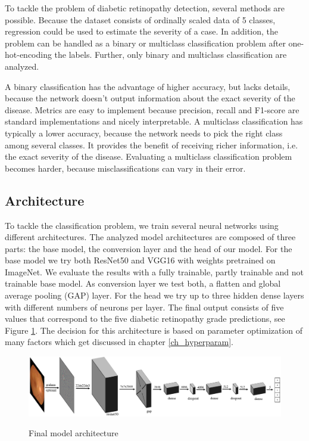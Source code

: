 \documentclass{article}
\begin{document}
To tackle the problem of diabetic retinopathy detection, several methods are possible. Because the dataset consists of 
ordinally scaled data of 5 classes, regression could be used to estimate the severity of a case. In addition, the problem 
can be handled as a binary or multiclass classification problem after one-hot-encoding the labels.
Further, only binary and multiclass classification are analyzed.

A binary classification has the advantage of higher accuracy, but lacks details, because the network doesn't output 
information about the exact severity of the disease. Metrics are easy to implement because precision, 
recall and F1-score are standard implementations and nicely interpretable. A multiclass classification has typically a 
lower accuracy, because the network needs to pick the right class among 
several classes. It provides the benefit of receiving richer information, i.e. the exact severity of the disease.
Evaluating a multiclass classification problem becomes harder, because misclassifications can vary in their error.

\subsection{Architecture}
To tackle the classification problem, we train several neural networks using different architectures.
The analyzed model architectures are composed of three parts: the 
base model, the conversion layer and the head of our model. For the base model we try both ResNet50 and VGG16 with 
weights pretrained on ImageNet. We evaluate the results with a fully trainable, partly trainable and not trainable
base model. As conversion layer we test both, a flatten and global average pooling (GAP) layer.
For the head we try up to three hidden dense layers with different numbers of neurons per layer.
The final output consists of five values that correspond to the five diabetic retinopathy grade predictions, see Figure \ref{fig:architecture}.
The decision for this architecture is based on parameter optimization of many factors which get discussed in chapter \ref{ch_hyperparam}.

\begin{figure}[h]
  \centering
  \includegraphics[width=1\textwidth]{2_2_architecture.png}\label{fig:architecture}
  \caption{Final model architecture}
  \label{fig:architecture}
\end{figure}
\end{document}
